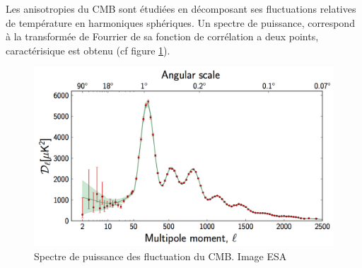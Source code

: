 Les anisotropies du \ac{CMB} sont étudiées en décomposant ses fluctuations relatives de température en harmoniques sphériques.
Un spectre de puissance, correspond à la transformée de Fourrier de sa fonction de corrélation a deux points, caractérisique est obtenu (cf figure \ref{fig:cmb_power_spectrum}).

%
%
%
%
%
%


\begin{figure}[bth]
        \includegraphics[width=.95\linewidth]{img/01/CMB_power_spectrum.png} 
        \caption[Spectre de puissance des fluctuation du CMB]{Spectre de puissance des fluctuation du \ac{CMB}.
        Image ESA}
 		\label{fig:cmb_power_spectrum}
\end{figure}

